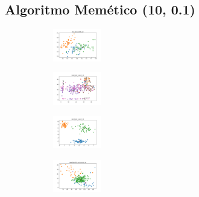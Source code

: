 \vspace*{\fill}
\newpage


\subsection{Algoritmo Memético (10, 0.1)}

\begin{figure}[H]    
    \centering
    \begin{subfigure}
        \centering
        \includegraphics[width=0.234\textwidth]{img/am01/iris_set_const_10_949004259_clust.png}
    \end{subfigure}
    \hfill
    \begin{subfigure}
        \centering
        \includegraphics[width=0.234\textwidth]{img/am01/ecoli_set_const_10_949004259_clust.png}
    \end{subfigure}
    \hfill
    \begin{subfigure}
        \centering
        \includegraphics[width=0.234\textwidth]{img/am01/rand_set_const_10_949004259_clust.png}
    \end{subfigure}
    \hfill
    \begin{subfigure}
        \centering
        \includegraphics[width=0.234\textwidth]{img/am01/newthyroid_set_const_10_949004259_clust.png}

\end{subfigure}
\end{figure}
